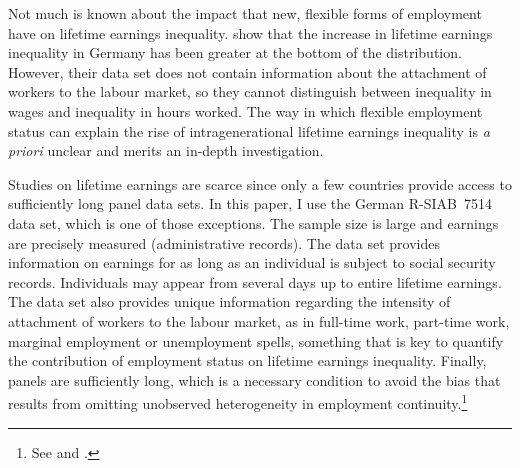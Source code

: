 \documentclass[12pt, a4paper]{article}
\begin{document}
Not much is known about the impact that new, flexible forms of employment have on lifetime earnings inequality. \cite{BoCo15} show that the increase in lifetime earnings inequality in Germany has been greater at the bottom of the distribution. However, their data set does not contain information about the attachment of workers to the labour market, so they cannot distinguish between inequality in wages and inequality in hours worked. The way in which flexible employment status can explain the rise of intragenerational lifetime earnings inequality is \emph{a priori} unclear and merits an in-depth investigation.






Studies on lifetime earnings are scarce since only a few countries provide access to sufficiently long panel data sets. In this paper, I use the German \mbox{R-SIAB 7514} data set, which is one of those exceptions. The sample size is large and earnings are precisely measured (administrative records). The data set provides information on earnings for as long as an individual is subject to social security records. Individuals may appear from several days up to entire lifetime earnings. The data set also provides unique information regarding the intensity of attachment of workers to the labour market, as in full-time work, part-time work, marginal employment or unemployment spells, something that is key to quantify the contribution of employment status on lifetime earnings inequality. Finally, panels are sufficiently long, which is a necessary condition to avoid the bias that results from omitting unobserved heterogeneity in employment continuity.\footnote{See \cite{AddiSur08} and \cite{BowRo10}.} 
\end{document}
